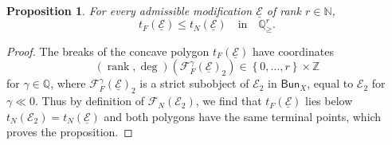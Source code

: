 \documentclass[11pt]{article}
\newtheorem{prop}[theo]{Proposition}
\theoremstyle{definition}
\numberwithin{equation}{section}
\numberwithin{figure}{section}
\numberwithin{table}{section}
\newcommand{\Bun}{\mathsf{Bun}}
\DeclareMathOperator{\rank}{rank}
\begin{document}
\begin{prop}\label{prop:OnAdmModif_CompFarguesNewton}
For every admissible modification $\underline{\mathcal{E}}$ of rank $r\in\mathbb{N}$,
\[
t_{F}(\underline{\mathcal{E}})\leq t_{N}(\underline{\mathcal{E}})\quad\text{in}\quad\mathbb{Q}_{\geq}^{r}.
\]
\end{prop}
\begin{proof}
The breaks of the concave polygon $t_{F}(\underline{\mathcal{E}})$ have coordinates
\[
\left(\rank,\deg\right)\left(\mathcal{F}_{F}^{\gamma}(\underline{\mathcal{E}})_{2}\right)\in\left\{ 0,\dots,r\right\} \times\mathbb{Z}
\]
for $\gamma\in\mathbb{Q}$, where $\mathcal{F}_{F}^{\gamma}(\underline{\mathcal{E}})_{2}$ is a strict subobject of $\mathcal{E}_{2}$ in $\Bun_{X}$, equal to $\mathcal{E}_{2}$ for $\gamma\ll0$. Thus by definition of $\mathcal{F}_{N}(\mathcal{E}_{2})$, we find that $t_{F}(\underline{\mathcal{E}})$ lies below $t_{N}(\mathcal{E}_{2})=t_{N}(\underline{\mathcal{E}})$ and both polygons have the same terminal points, which proves the proposition.
\end{proof}

\subsubsection{}
\end{document}
